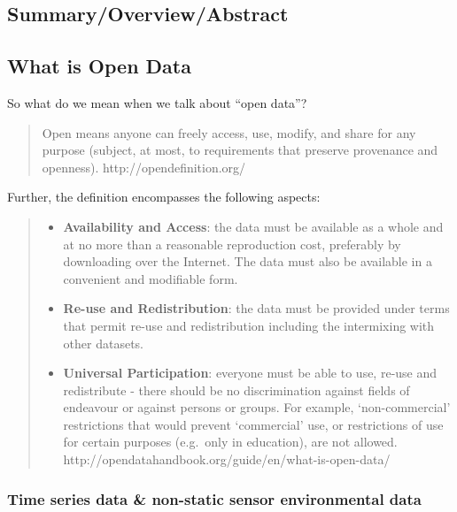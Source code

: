 \subsection{Summary/Overview/Abstract}\label{summaryoverviewabstract}

\subsection{What is Open Data}\label{what-is-open-data}

So what do we mean when we talk about ``open data''?

\begin{quote}
Open means anyone can freely access, use, modify, and share for any
purpose (subject, at most, to requirements that preserve provenance and
openness). http://opendefinition.org/
\end{quote}

Further, the definition encompasses the following aspects:

\begin{quote}
\begin{itemize}
\tightlist
\item
  \textbf{Availability and Access}: the data must be available as a
  whole and at no more than a reasonable reproduction cost, preferably
  by downloading over the Internet. The data must also be available in a
  convenient and modifiable form.
\item
  \textbf{Re-use and Redistribution}: the data must be provided under
  terms that permit re-use and redistribution including the intermixing
  with other datasets.
\item
  \textbf{Universal Participation}: everyone must be able to use, re-use
  and redistribute - there should be no discrimination against fields of
  endeavour or against persons or groups. For example, `non-commercial'
  restrictions that would prevent `commercial' use, or restrictions of
  use for certain purposes (e.g.~only in education), are not allowed.
  http://opendatahandbook.org/guide/en/what-is-open-data/
\end{itemize}
\end{quote}

\subsubsection{Time series data \& non-static sensor environmental
data}\label{time-series-data-non-static-sensor-environmental-data}

